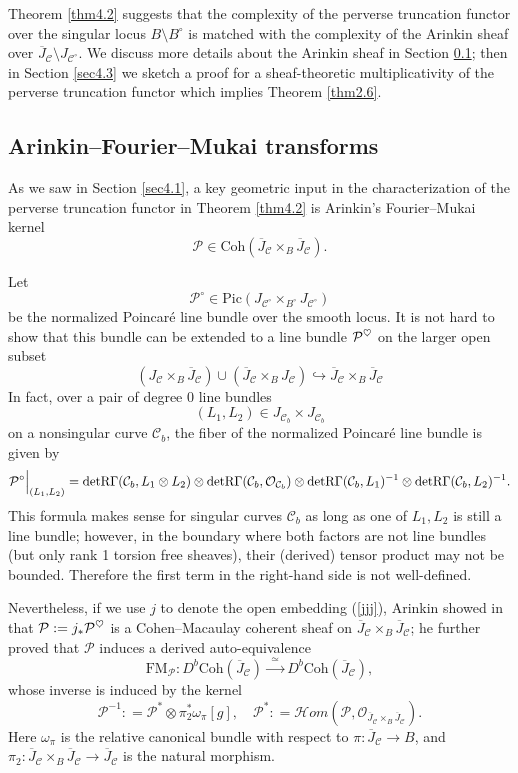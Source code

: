 \documentclass{pspum-l}
\theoremstyle{plain}
\theoremstyle{definition}
\theoremstyle{remark}
\newcommand{\CC}{{\mathcal C}}
\newcommand{\CH}{{\mathcal H}}
\newcommand{\CO}{{\mathcal O}}
\newcommand{\CP}{{\mathcal P}}
\newcommand{\heart}{\ensuremath\heartsuit}
\begin{document}
Theorem \ref{thm4.2} suggests that the complexity of the perverse truncation functor over the singular locus $B \setminus B^\circ$ is matched with the complexity of the Arinkin sheaf over $\overline{J}_\CC \setminus J_{\CC^\circ}$. We discuss more details about the Arinkin sheaf in Section \ref{sec4.2}; then in Section \ref{sec4.3} we sketch a proof for a sheaf-theoretic multiplicativity of the perverse truncation functor which implies Theorem \ref{thm2.6}.



\subsection{Arinkin--Fourier--Mukai transforms}\label{sec4.2}


As we saw in Section \ref{sec4.1}, a key geometric input in the characterization of the perverse truncation functor in Theorem \ref{thm4.2} is Arinkin's Fourier--Mukai kernel
\[
\CP \in \mathrm{Coh}\left( \overline{J}_\CC \times_B \overline{J}_\CC \right).
\]

Let
\[
\CP^\circ \in \mathrm{Pic}\left(J_{\CC^\circ} \times_{B^\circ} J_{\CC^\circ} \right)
\]
be the normalized Poincar\'e line bundle over the smooth locus. It is not hard to show that this bundle can be extended to a line bundle $\CP^{\heart}$ on the larger open subset
\begin{equation}\label{jjj}
 \left(J_\CC \times_B \overline{J}_\CC \right) \cup \left( \overline{J}_\CC \times_B {J}_\CC \right)
 \hookrightarrow \overline{J}_\CC \times_B \overline{J}_\CC
 \end{equation}
 In fact, over a pair of degree 0 line bundles
\[
(L_1, L_2) \in J_{\CC_b} \times J_{\CC_b}
\]
on a nonsingular curve $\CC_b$, the fiber of the normalized Poincar\'e line bundle is given by 
\[
\CP^\circ\Big{|}_{(L_1,L_2)} = \mathrm{det}\mathrm{R}\Gamma(\CC_b, L_1\otimes L_2) \otimes \mathrm{det}\mathrm{R}\Gamma(\CC_b, \CO_{\CC_b}) \otimes \mathrm{det}\mathrm{R}\Gamma(\CC_b, L_1)^{-1}\otimes \mathrm{det}\mathrm{R}\Gamma(\CC_b, L_2)^{-1}.
\]
This formula makes sense for singular curves $\CC_b$ as long as one of $L_1, L_2$ is still a line bundle; however, in the boundary where both factors are not line bundles (but only rank 1 torsion free sheaves), their (derived) tensor product may not be bounded. Therefore the first term in the right-hand side is not well-defined.

Nevertheless, if we use $j$ to denote the open embedding (\ref{jjj}), Arinkin showed in \cite{A2} that $\CP:=j_*\CP^{\heart}$ is a Cohen--Macaulay coherent sheaf on $\overline{J}_\CC \times_B \overline{J}_\CC$; he further proved that $\CP$ induces a derived auto-equivalence
\[
\mathrm{FM}_{\CP}: D^b\mathrm{Coh}(\overline{J}_\CC) \xrightarrow{~~\simeq~~} D^b\mathrm{Coh}(\overline{J}_\CC),
\]
whose inverse is induced by the kernel
\[
\CP^{-1} : = \CP^* \otimes \pi_2^* \omega_{\pi}[g], \quad \CP^*: = {\CH}om(\CP, \CO_{\overline{J}_\CC\times_B \overline{J}_\CC}).
\]
Here $\omega_\pi$ is the relative canonical bundle with respect to $\pi: \overline{J}_\CC \to B$, and $\pi_2: \overline{J}_\CC \times_B \overline{J}_\CC \to \overline{J}_\CC$ is the natural morphism.
\end{document}
